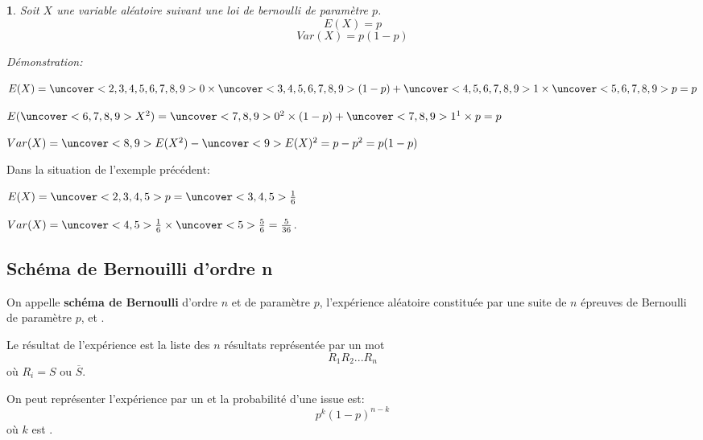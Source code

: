 \documentclass{beamer}
\newtheorem{proposition}[theorem]{\translate{Proposition}}
\begin{document}
 \begin{frame}
 \begin{proposition}
  Soit $X$ une variable aléatoire suivant une loi de bernoulli de paramètre $p$.
  $$E(X)=p$$ $$Var(X)=p(1-p)$$
  
  Démonstration:
  
  $E(X)=\uncover<2,3,4,5,6,7,8,9>{0} \times \uncover<3,4,5,6,7,8,9>{(1-p)}+ 
  \uncover<4,5,6,7,8,9>{1}\times \uncover<5,6,7,8,9>{p}=p$
  
  $E(\uncover<6,7,8,9>{X^2})=\uncover<7,8,9>{0^2} \times (1-p)+\uncover<7,8,9>{1^1} \times p=p$
  
  $Var(X)=\uncover<8,9>{E(X^2)}-\uncover<9>{E(X)^2}=p-p^2=p(1-p)$
 \end{proposition}
\end{frame}

  \begin{frame}
  
   \begin{example}
 Dans la situation de l'exemple précédent:
 
 $E(X)=\uncover<2,3,4,5>{p}=\uncover<3,4,5>{\frac{1}{6}}$
 
 $Var(X)=\uncover<4,5>{\frac{1}{6}} \times \uncover<5>{\frac{5}{6}}=\frac{5}{36}$.
  
 \end{example}
 \end{frame}
 
 \subsection{Schéma de Bernouilli d'ordre n}

 \begin{frame}
  
  \begin{definition}
  On appelle \textbf{schéma de Bernoulli} d'ordre $n$ et de paramètre $p$, 
  l'expérience aléatoire constituée
  par une suite de $n$ épreuves de Bernoulli de paramètre $p$, 
   et .
  
  Le résultat de l'expérience est la liste des $n$ résultats représentée par un mot
  $$R_1R_2...R_n$$
  où $R_i= S$ ou $\overline{S}$.
  
  On peut représenter l'expérience par un  et la probabilité d'une issue est:
  $$p^k(1-p)^{n-k}$$ où $k$ est .
 \end{definition}

 \end{frame}
 
\end{document}
